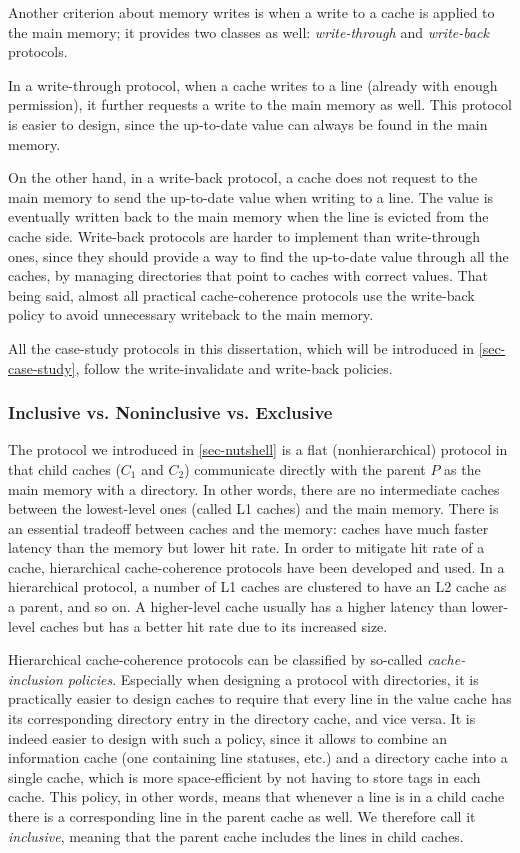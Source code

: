 Another criterion about memory writes is when a write to a cache is applied to the main memory; it provides two classes as well: \emph{write-through} and \emph{write-back} protocols.

In a write-through protocol, when a cache writes to a line (already with enough permission), it further requests a write to the main memory as well.
This protocol is easier to design, since the up-to-date value can always be found in the main memory.

On the other hand, in a write-back protocol, a cache does not request to the main memory to send the up-to-date value when writing to a line.
The value is eventually written back to the main memory when the line is evicted from the cache side.
Write-back protocols are harder to implement than write-through ones, since they should provide a way to find the up-to-date value through all the caches, \eg{} by managing directories that point to caches with correct values.
That being said, almost all practical cache-coherence protocols use the write-back policy to avoid unnecessary writeback to the main memory.

All the case-study protocols in this dissertation, which will be introduced in \autoref{sec-case-study}, follow the write-invalidate and write-back policies.

\subsubsection{Inclusive vs. Noninclusive vs. Exclusive}

The protocol we introduced in \autoref{sec-nutshell} is a flat (nonhierarchical) protocol in that child caches ($C_1$ and $C_2$) communicate directly with the parent $P$ as the main memory with a directory.
In other words, there are no intermediate caches between the lowest-level ones (called L1 caches) and the main memory.
There is an essential tradeoff between caches and the memory: caches have much faster latency than the memory but lower hit rate.
In order to mitigate hit rate of a cache, hierarchical cache-coherence protocols have been developed and used.
In a hierarchical protocol, a number of L1 caches are clustered to have an L2 cache as a parent, and so on.
A higher-level cache usually has a higher latency than lower-level caches but has a better hit rate due to its increased size.

Hierarchical cache-coherence protocols can be classified by so-called \emph{cache-inclusion policies}.
Especially when designing a protocol with directories, it is practically easier to design caches to require that every line in the value cache has its corresponding directory entry in the directory cache, and vice versa.
It is indeed easier to design with such a policy, since it allows to combine an information cache (one containing line statuses, etc.) and a directory cache into a single cache, which is more space-efficient by not having to store tags in each cache.
This policy, in other words, means that whenever a line is in a child cache there is a corresponding line in the parent cache as well.
We therefore call it \emph{inclusive}, meaning that the parent cache includes the lines in child caches.

